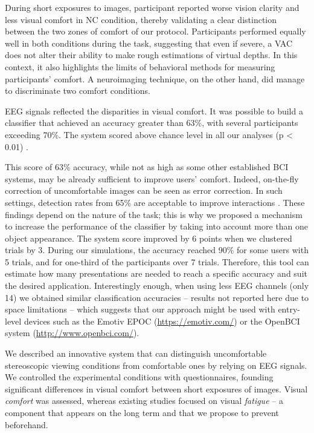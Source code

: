 \documentclass{template/llncs}
\begin{document}
During short exposures to images, participant reported worse vision clarity and less visual comfort in NC condition, thereby validating a clear distinction between the two zones of comfort of our protocol. Participants performed equally well in both conditions during the task, suggesting that even if severe, a VAC does not alter their ability to make rough estimations of virtual depths. In this context, it also highlights the limits of behavioral methods for measuring participants' comfort. A neuroimaging technique, on the other hand, did manage to discriminate two comfort conditions.

EEG signals reflected the disparities in visual comfort. 
It was possible to build a classifier that achieved an accuracy greater than 63\%, with several participants exceeding 70\%. The system scored above chance level in all our analyses (p \textless{} 0.01) \cite{Muller-Putz2008}. 

This score of 63\% accuracy, while not as high as some other established BCI systems, may be already sufficient to improve users' comfort. Indeed, on-the-fly correction of uncomfortable images can be seen as error correction. In such settings, detection rates from 65\% are acceptable to improve interactions \cite{Vi2012}. These findings depend on the nature of the task; this is why we proposed a mechanism to increase the performance of the classifier by taking into account more than one object appearance. The system score improved by 6 points when we clustered trials by 3. During our simulations, the accuracy reached 90\% for some users with 5 trials, and for one-third of the participants over 7 trials. 
Therefore, this tool can estimate how many presentations are needed to reach a specific accuracy and suit the desired application.
Interestingly enough, when using less EEG channels (only 14) we obtained similar classification accuracies -- results not reported here due to space limitations -- which suggests that our approach might be used with entry-level devices such as the Emotiv EPOC (\url{https://emotiv.com/}) or the OpenBCI system (\url{http://www.openbci.com/}).







We described an innovative system that can distinguish uncomfortable stereoscopic viewing conditions from comfortable ones by relying on EEG signals. We controlled the experimental conditions with questionnaires, founding significant differences in visual comfort between short exposures of images. Visual \emph{comfort} was assessed, whereas existing studies focused on visual \emph{fatigue} -- a component that appears on the long term and that we propose to prevent beforehand.
\end{document}
